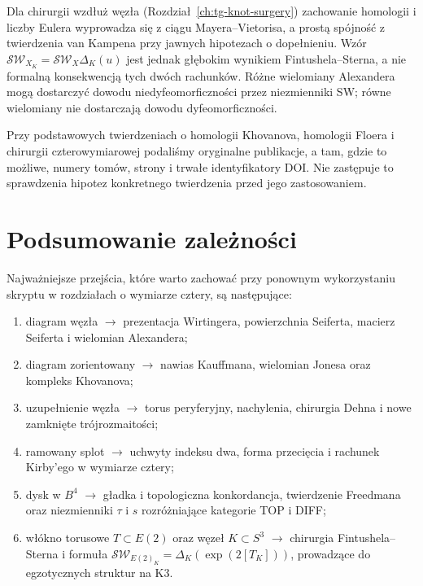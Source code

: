 Dla chirurgii wzdłuż węzła
(Rozdział~\ref{ch:tg-knot-surgery})
zachowanie homologii i liczby Eulera
wyprowadza się z ciągu
Mayera--Vietorisa, a prostą spójność
z twierdzenia van Kampena przy
jawnych hipotezach o dopełnieniu.
Wzór
$\mathcal{SW}_{X_K}=\mathcal{SW}_X\Delta_K(u)$
jest jednak głębokim wynikiem
Fintushela--Sterna, a nie formalną
konsekwencją tych dwóch rachunków.
Różne wielomiany Alexandera
mogą dostarczyć dowodu
niedyfeomorficzności przez
niezmienniki SW; równe wielomiany
nie dostarczają dowodu
dyfeomorficzności.

\begin{uwaga}
Przy podstawowych twierdzeniach o
homologii Khovanova, homologii Floera
i chirurgii czterowymiarowej
podaliśmy oryginalne publikacje,
a tam, gdzie to możliwe,
numery tomów, strony i trwałe
identyfikatory DOI.
Nie zastępuje to sprawdzenia
hipotez konkretnego twierdzenia
przed jego zastosowaniem.
\end{uwaga}

\section*{Podsumowanie zależności}
Najważniejsze przejścia, które warto zachować przy ponownym
wykorzystaniu skryptu w rozdziałach o wymiarze cztery, są następujące:
\begin{enumerate}[label=(\roman*)]
\item diagram węzła $\longrightarrow$ prezentacja Wirtingera,
powierzchnia Seiferta, macierz Seiferta i wielomian Alexandera;
\item diagram zorientowany $\longrightarrow$ nawias Kauffmana,
wielomian Jonesa oraz kompleks Khovanova;
\item uzupełnienie węzła $\longrightarrow$ torus peryferyjny,
nachylenia, chirurgia Dehna i nowe zamknięte trójrozmaitości;
\item ramowany splot $\longrightarrow$ uchwyty indeksu dwa,
forma przecięcia i rachunek Kirby'ego w wymiarze cztery;
\item dysk w $B^4$ $\longrightarrow$ gładka i topologiczna
konkordancja, twierdzenie Freedmana oraz niezmienniki
$\tau$ i $s$ rozróżniające kategorie TOP i DIFF;
\item włókno torusowe $T\subset E(2)$ oraz węzeł $K\subset S^3$
$\longrightarrow$ chirurgia Fintushela--Sterna i formuła
$\mathcal{SW}_{E(2)_K}=\Delta_K(\exp(2[T_K]))$,
prowadzące do egzotycznych struktur na K3.
\end{enumerate}



